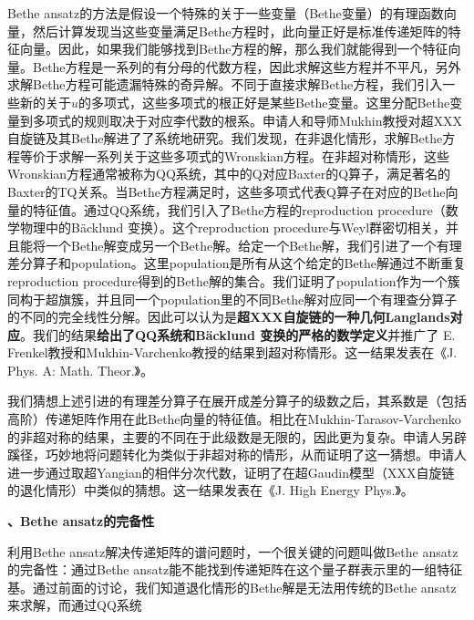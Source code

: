 \documentclass[12pt,UTF8,AutoFakeBold=4,a4paper]{ctexart}
\begin{document}
Bethe ansatz的方法是假设一个特殊的关于一些变量（Bethe变量）的有理函数向量，然后计算发现当这些变量满足Bethe方程时，此向量正好是标准传递矩阵的特征向量。因此，如果我们能够找到Bethe方程的解，那么我们就能得到一个特征向量。Bethe方程是一系列的有分母的代数方程，因此求解这些方程并不平凡，另外求解Bethe方程可能遗漏特殊的奇异解。不同于直接求解Bethe方程，我们引入一些新的关于$u$的多项式，这些多项式的根正好是某些Bethe变量。这里分配Bethe变量到多项式的规则取决于对应李代数的根系。申请人和导师Mukhin教授对超XXX自旋链及其Bethe解进了了系统地研究。我们发现，在非退化情形，求解Bethe方程等价于求解一系列关于这些多项式的Wronskian方程。在非超对称情形，这些Wronskian方程通常被称为QQ系统，其中的Q对应Baxter的Q算子，满足著名的Baxter的TQ关系。当Bethe方程满足时，这些多项式代表Q算子在对应的Bethe向量的特征值。通过QQ系统，我们引入了Bethe方程的reproduction procedure（数学物理中的B\"{a}cklund 变换）。这个reproduction procedure与Weyl群密切相关，并且能将一个Bethe解变成另一个Bethe解。给定一个Bethe解，我们引进了一个有理差分算子和population。这里population是所有从这个给定的Bethe解通过不断重复reproduction procedure得到的Bethe解的集合。我们证明了population作为一个簇同构于超旗簇，并且同一个population里的不同Bethe解对应同一个有理查分算子的不同的完全线性分解。因此可以认为是\textbf{超XXX自旋链的一种几何Langlands对应}。我们的结果\textbf{给出了QQ系统和B\"{a}cklund 变换的严格的数学定义}并推广了 E. Frenkel教授和Mukhin-Varchenko教授的结果到超对称情形。这一结果发表在《J. Phys. A: Math. Theor.》。

我们猜想上述引进的有理差分算子在展开成差分算子的级数之后，其系数是（包括高阶）传递矩阵作用在此Bethe向量的特征值。相比在Mukhin-Tarasov-Varchenko的非超对称的结果，主要的不同在于此级数是无限的，因此更为复杂。申请人另辟蹊径，巧妙地将问题转化为类似于非超对称的情形，从而证明了这一猜想。申请人进一步通过取超Yangian的相伴分次代数，证明了在超Gaudin模型（XXX自旋链的退化情形）中类似的猜想。这一结果发表在《J. High Energy Phys.》。



\medskip

\textbf{、Bethe ansatz的完备性}

利用Bethe ansatz解决传递矩阵的谱问题时，一个很关键的问题叫做Bethe ansatz的完备性：通过Bethe ansatz能不能找到传递矩阵在这个量子群表示里的一组特征基。通过前面的讨论，我们知道退化情形的Bethe解是无法用传统的Bethe ansatz来求解，而通过QQ系统
\end{document}
